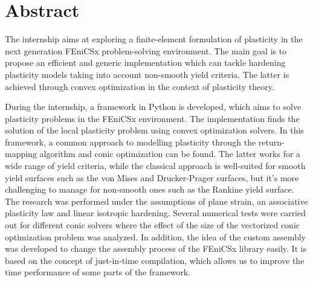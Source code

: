 \documentclass[12pt]{article}
\begin{document}


\newpage
\section*{\centering Abstract}

The internship aims at exploring a finite-element formulation of plasticity in the next generation FEniCSx problem-solving environment. The main goal is to propose an efficient and generic implementation which can tackle hardening plasticity models taking into account non-smooth yield criteria. The latter is achieved through convex optimization in the context of plasticity theory.

During the internship, a framework in Python is developed, which aims to solve plasticity problems in the FEniCSx environment. The implementation finds the solution of the local plasticity problem using convex optimization solvers. In this framework, a common approach to modelling plasticity through the return-mapping algorithm and conic optimization can be found. The latter works for a wide range of yield criteria, while the classical approach is well-suited for smooth yield surfaces such as the von Mises and Drucker-Prager surfaces, but it's more challenging to manage for non-smooth ones such as the Rankine yield surface. The research was performed under the assumptions of plane strain, an associative plasticity law and linear isotropic hardening. Several numerical tests were carried out for different conic solvers where the effect of the size of the vectorized conic optimization problem was analyzed. In addition, the idea of the custom assembly was developed to change the assembly process of the FEniCSx library easily. It is based on the concept of just-in-time compilation, which allows us to improve the time performance of some parts of the framework.
\end{document}
